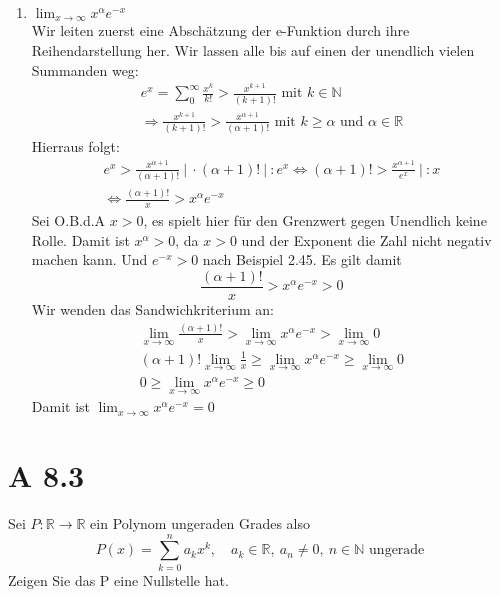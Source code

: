 \documentclass{article}
\begin{document}
\begin{enumerate}[ label = (\roman*) ]
        \item \( \lim_{x \to \infty} x^{\alpha} e^{-x}\) \\
        Wir leiten zuerst eine Abschätzung der e-Funktion durch ihre Reihendarstellung her. Wir lassen alle bis auf einen der unendlich vielen Summanden weg:
        \begin{gather*}
            e^x = \sum_0^{\infty} \frac{x^k}{k!} > \frac{x^{k+1}}{(k+1)!} \text{ mit } k \in \mathbb{N} \\
            \Rightarrow \frac{x^{k+1}}{(k+1)!} > \frac{x^{\alpha +1}}{(\alpha + 1)!} \text{ mit } k \geq \alpha \text{ und } \alpha \in \mathbb{R}
        \end{gather*}
        Hierraus folgt:
        \begin{gather*}
            e^x > \frac{x^{\alpha +1}}{(\alpha + 1)!} \ | \ \cdot (\alpha + 1)! \ | \ :  e^x
            \Leftrightarrow (\alpha + 1)! > \frac{x^{\alpha +1}}{e^x} \ | \ :x \\
            \Leftrightarrow \frac{(\alpha+1)!}{x} > x^{\alpha} e^{-x}
        \end{gather*}
        Sei O.B.d.A \(x > 0\), es spielt hier für den Grenzwert gegen Unendlich keine Rolle.
        Damit ist \(x^{\alpha} > 0\), da \(x > 0\) und der Exponent die Zahl nicht negativ machen kann. Und \(e^{-x} > 0\) nach Beispiel 2.45.
        Es gilt damit
        \[ \frac{(\alpha+1)!}{x} > x^{\alpha} e^{-x} > 0 \]
        Wir wenden das Sandwichkriterium an:
        \begin{gather*}
            \lim_{x \to \infty} \frac{(\alpha+1)!}{x} > \lim_{x \to \infty} x^{\alpha} e^{-x} > \lim_{x \to \infty} 0 \\
            (\alpha+1)! \lim_{x \to \infty} \frac{1}{x} \geq \lim_{x \to \infty} x^{\alpha} e^{-x} \geq \lim_{x \to \infty} 0 \\
            0 \geq \lim_{x \to \infty} x^{\alpha} e^{-x} \geq 0
        \end{gather*}
        Damit ist \( \lim_{x \to \infty} x^{\alpha} e^{-x} = 0\)

    \end{enumerate}

    \section*{A 8.3}
    Sei \(P: \mathbb{R} \to \mathbb{R}\) ein Polynom ungeraden Grades also
    \[P(x) = \sum_{k=0}^{n} a_k x^{k}, \quad a_k \in \mathbb{R}, \ a_n \neq 0, \ n \in \mathbb{N} \text{ ungerade}\]
    Zeigen Sie das P eine Nullstelle hat.
    
\end{document}
